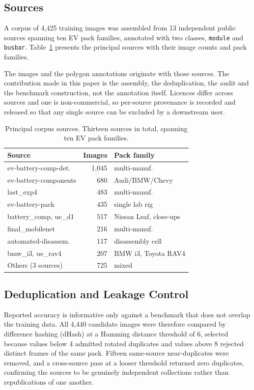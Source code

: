 \subsection{Sources}

\noindent A corpus of 4,425 training images was assembled from 13 independent
public sources spanning ten EV pack families, annotated with two classes,
\texttt{module} and \texttt{busbar}. Table~\ref{tab:sources} presents the
principal sources with their image counts and pack families.

The images and the polygon annotations originate with those sources. The
contribution made in this paper is the assembly, the deduplication, the audit and
the benchmark construction, not the annotation itself. Licences differ across
sources and one is non-commercial, so per-source provenance is recorded and
released so that any single source can be excluded by a downstream user.

\begin{table}[t]
\caption{Principal corpus sources. Thirteen sources in total, spanning ten EV
pack families.}
\label{tab:sources}
\centering\scriptsize
\setlength{\tabcolsep}{3.5pt}
\begin{tabular}{lrl}
\hline
Source & Images & Pack family \\
\hline
ev-battery-comp-det. & 1,045 & multi-manuf. \\
ev-battery-components & 680 & Audi/BMW/Chevy \\
last\_exp4 & 483 & multi-manuf. \\
ev-battery-pack & 435 & single lab rig \\
battery\_comp, ue\_d1 & 517 & Nissan Leaf, close-ups \\
final\_mobilenet & 216 & multi-manuf. \\
automated-disassem. & 117 & disassembly cell \\
bmw\_i3, ue\_rav4 & 207 & BMW i3, Toyota RAV4 \\
Others (3 sources) & 725 & mixed \\
\hline
\end{tabular}
\end{table}

\subsection{Deduplication and Leakage Control}

\noindent Reported accuracy is informative only against a benchmark that does not
overlap the training data. All 4,440 candidate images were therefore compared by difference hashing (dHash) at a
Hamming distance threshold of 6, selected because values below 4 admitted rotated
duplicates and values above 8 rejected distinct frames of the same pack. Fifteen
same-source near-duplicates were removed, and a cross-source pass at a looser
threshold returned zero duplicates, confirming the sources to be genuinely independent
collections rather than republications of one another.

